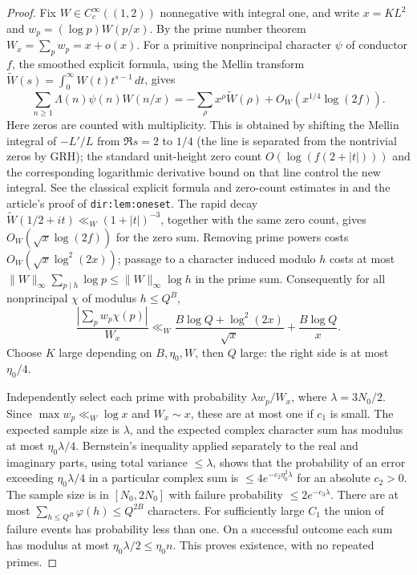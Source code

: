 \documentclass[11pt]{article}
\theoremstyle{remark}\newtheorem{remark}[theorem]{Remark}
\newcommand{\abs}[1]{\left|#1\right|}
\begin{document}
\begin{proof}
Fix $W\in C_c^\infty((1,2))$ nonnegative with integral one, and write $x=KL^2$ and $w_p=(\log p)W(p/x)$. By the prime number theorem $W_x=\sum_p w_p=x+o(x)$. For a primitive nonprincipal character $\psi$ of conductor $f$, the smoothed explicit formula, using the Mellin transform $\widetilde W(s)=\int_0^\infty W(t)t^{s-1}\,dt$, gives
\[
\sum_{n\ge1}\Lambda(n)\psi(n)W(n/x)
=-\sum_\rho x^\rho\widetilde W(\rho)+O_W(x^{1/4}\log(2f)).
\]
Here zeros are counted with multiplicity. This is obtained by shifting the Mellin integral of $-L'/L$ from $\Re s=2$ to $1/4$ (the line is separated from the nontrivial zeros by GRH); the standard unit-height zero count $O(\log(f(2+|t|)))$ and the corresponding logarithmic derivative bound on that line control the new integral. See the classical explicit formula and zero-count estimates in \cite{mv} and the article's proof of \texttt{dir:lem:oneset}. The rapid decay $\widetilde W(1/2+it)\ll_W(1+|t|)^{-3}$, together with the same zero count, gives $O_W(\sqrt{x}\log(2f))$ for the zero sum. Removing prime powers costs $O_W(\sqrt{x}\log^2(2x))$; passage to a character induced modulo $h$ costs at most $\|W\|_\infty\sum_{p\mid h}\log p\le\|W\|_\infty\log h$ in the prime sum. Consequently for all nonprincipal $\chi$ of modulus $h\le Q^B$,
\[
\frac{\abs{\sum_p w_p\chi(p)}}{W_x}
\ll_W \frac{B\log Q+\log^2(2x)}{\sqrt{x}}+\frac{B\log Q}{x}.
\]
Choose $K$ large depending on $B,\eta_0,W$, then $Q$ large: the right side is at most $\eta_0/4$.

Independently select each prime with probability $\lambda w_p/W_x$, where $\lambda=3N_0/2$. Since $\max w_p\ll_W\log x$ and $W_x\sim x$, these are at most one if $c_1$ is small. The expected sample size is $\lambda$, and the expected complex character sum has modulus at most $\eta_0\lambda/4$. Bernstein's inequality applied separately to the real and imaginary parts, using total variance $\le\lambda$, shows that the probability of an error exceeding $\eta_0\lambda/4$ in a particular complex sum is $\le4e^{-c_2\eta_0^2\lambda}$ for an absolute $c_2>0$. The sample size is in $[N_0,2N_0]$ with failure probability $\le2e^{-c_3\lambda}$. There are at most $\sum_{h\le Q^B}\varphi(h)\le Q^{2B}$ characters. For sufficiently large $C_1$ the union of failure events has probability less than one. On a successful outcome each sum has modulus at most $\eta_0\lambda/2\le\eta_0 n$. This proves existence, with no repeated primes.
\end{proof}
\end{document}
